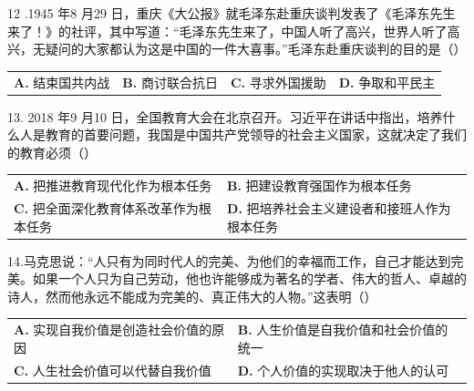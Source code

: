 \documentclass[UTF8,11pt]{ctexart}
\begin{document}
12 .1945 年8 月29 日，重庆《大公报》就毛泽东赴重庆谈判发表了《毛泽东先生来了！》的社评，其中写道：“毛泽东先生来了，中国人听了高兴，世界人听了高兴，无疑问的大家都认为这是中国的一件大喜事。”毛泽东赴重庆谈判的目的是（）


\begin{center}\begin{tabular}{>{\raggedright\arraybackslash}p{\dimexpr(\linewidth-8\tabcolsep)/4\relax}>{\raggedright\arraybackslash}p{\dimexpr(\linewidth-8\tabcolsep)/4\relax}>{\raggedright\arraybackslash}p{\dimexpr(\linewidth-8\tabcolsep)/4\relax}>{\raggedright\arraybackslash}p{\dimexpr(\linewidth-8\tabcolsep)/4\relax}}
\textbf{A.} 结束国共内战 & \textbf{B.} 商讨联合抗日 & \textbf{C.} 寻求外国援助 & \textbf{D.} 争取和平民主\\[.35em]\end{tabular}\end{center}

13. 2018 年9 月10 日，全国教育大会在北京召开。习近平在讲话中指出，培养什么人是教育的首要问题，我国是中国共产党领导的社会主义国家，这就决定了我们的教育必须（）


\begin{center}\begin{tabular}{>{\raggedright\arraybackslash}p{\dimexpr(\linewidth-4\tabcolsep)/2\relax}>{\raggedright\arraybackslash}p{\dimexpr(\linewidth-4\tabcolsep)/2\relax}}
\textbf{A.} 把推进教育现代化作为根本任务 & \textbf{B.} 把建设教育强国作为根本任务\\[.35em]
\textbf{C.} 把全面深化教育体系改革作为根本任务 & \textbf{D.} 把培养社会主义建设者和接班人作为根本任务\\[.35em]\end{tabular}\end{center}

14.马克思说：“人只有为同时代人的完美、为他们的幸福而工作，自己才能达到完美。如果一个人只为自己劳动，他也许能够成为著名的学者、伟大的哲人、卓越的诗人，然而他永远不能成为完美的、真正伟大的人物。”这表明（）


\begin{center}\begin{tabular}{>{\raggedright\arraybackslash}p{\dimexpr(\linewidth-4\tabcolsep)/2\relax}>{\raggedright\arraybackslash}p{\dimexpr(\linewidth-4\tabcolsep)/2\relax}}
\textbf{A.} 实现自我价值是创造社会价值的原因 & \textbf{B.} 人生价值是自我价值和社会价值的统一\\[.35em]
\textbf{C.} 人生社会价值可以代替自我价值 & \textbf{D.} 个人价值的实现取决于他人的认可\\[.35em]\end{tabular}\end{center}
\end{document}
